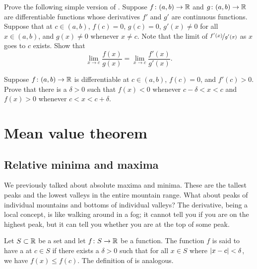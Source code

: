 \begin{exercise} \label{exercise:simpleLHopital}
Prove the following simple version of .
Suppose 
$f \colon (a,b) \to {\mathbb{R}}$ and $g \colon (a,b) \to {\mathbb{R}}$ are differentiable
functions
whose derivatives $f'$ and $g'$ are continuous functions.
Suppose that at $c \in (a,b)$, $f(c) = 0$, $g(c)=0$,
$g'(x) \not= 0$ for all $x \in (a,b)$, and
$g(x) \not= 0$ whenever $x \not= c$.   Note
that the limit of $\nicefrac{f'(x)}{g'(x)}$ as $x$ goes to $c$ exists.  Show that
\begin{equation*}
\lim_{x \to c} \frac{f(x)}{g(x)} = 
\lim_{x \to c} \frac{f'(x)}{g'(x)} .
\end{equation*}
\end{exercise}

\begin{exercise}
Suppose $f \colon (a,b) \to {\mathbb{R}}$ is differentiable at $c \in (a,b)$,
$f(c)=0$, and $f'(c) > 0$.
Prove that there is a $\delta > 0$ such that $f(x) < 0$
whenever $c-\delta < x < c$ and
$f(x) > 0$ 
whenever $c < x < c+\delta$.
\end{exercise}


\sectionnewpage
\section{Mean value theorem}
\label{sec:mvt}



\subsection{Relative minima and maxima}

We previously talked about absolute maxima and minima.  These are the tallest peaks and
the lowest valleys in the entire mountain range.  What
about peaks of individual mountains and bottoms of individual valleys?
The derivative, being a local concept, is like walking around in a fog; it
cannot tell you if you are on the highest peak, but it can tell you whether you are
at the top of some peak.

\begin{defn}
Let $S \subset {\mathbb{R}}$ be a set and
let $f \colon S \to {\mathbb{R}}$ be a function.  The function $f$ is said to have
a \emph{}
at $c \in S$ if there exists a $\delta>0$
such that for all $x \in S$ where $\left\lvert {x-c} \right\rvert < \delta$,
we have $f(x) \leq f(c)$.
The definition of
\emph{}
is analogous.
\end{defn}


